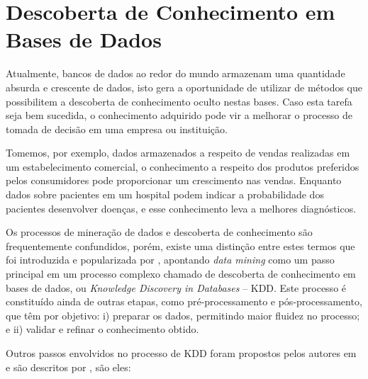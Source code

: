 \section{Descoberta de Conhecimento em Bases de Dados}
\label{sec:kdd}

Atualmente, bancos de dados ao redor do mundo armazenam uma quantidade absurda e crescente de dados, isto gera a oportunidade de utilizar de métodos que possibilitem a descoberta de conhecimento oculto nestas bases. Caso esta tarefa seja bem sucedida, o conhecimento adquirido pode vir a melhorar o processo de tomada de decisão em uma empresa ou instituição.

Tomemos, por exemplo, dados armazenados a respeito de vendas realizadas em um estabelecimento comercial, o conhecimento a respeito dos produtos preferidos pelos consumidores pode proporcionar um crescimento nas vendas. Enquanto dados sobre pacientes em um hospital podem indicar a probabilidade dos pacientes desenvolver doenças, e esse conhecimento leva a melhores diagnósticos.

Os processos de mineração de dados e descoberta de conhecimento são frequentemente confundidos, porém, existe uma distinção entre estes termos que foi introduzida e popularizada por , apontando \textit{data mining} como um passo principal em um processo complexo chamado de descoberta de conhecimento em bases de dados, ou \textit{Knowledge Discovery in Databases} {--} KDD. Este processo é constituído ainda de outras etapas, como pré\hyp{}processamento e pós\hyp{}processamento, que têm por objetivo: i) preparar os dados, permitindo maior fluidez no processo; e ii) validar e refinar o conhecimento obtido.

Outros passos envolvidos no processo de KDD foram propostos pelos autores em  e são descritos por , são eles:

